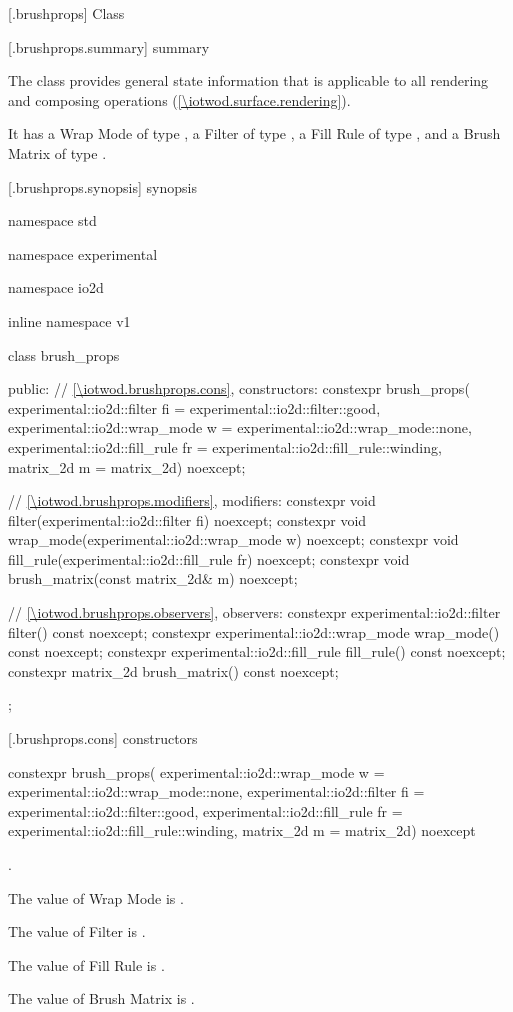
 [\iotwod.brushprops] {Class }

 [\iotwod.brushprops.summary] { summary}

\pnum
{}%
The  class provides general state information that is applicable to all rendering and composing operations (\ref{\iotwod.surface.rendering}).

\pnum
It has a Wrap Mode of type , a Filter of type , a Fill Rule of type , and a Brush Matrix of type .

 [\iotwod.brushprops.synopsis] { synopsis}

\begin{codeblock}
namespace std { namespace experimental { namespace io2d { inline namespace v1 {
  class brush_props {
  public:
    // \ref{\iotwod.brushprops.cons}, constructors:
    constexpr brush_props(
      experimental::io2d::filter fi = experimental::io2d::filter::good,
      experimental::io2d::wrap_mode w = experimental::io2d::wrap_mode::none,
      experimental::io2d::fill_rule fr = experimental::io2d::fill_rule::winding,
      matrix_2d m = matrix_2d{}) noexcept;

    // \ref{\iotwod.brushprops.modifiers}, modifiers:
    constexpr void filter(experimental::io2d::filter fi) noexcept;
    constexpr void wrap_mode(experimental::io2d::wrap_mode w) noexcept;
    constexpr void fill_rule(experimental::io2d::fill_rule fr) noexcept;
    constexpr void brush_matrix(const matrix_2d& m) noexcept;

    // \ref{\iotwod.brushprops.observers}, observers:
    constexpr experimental::io2d::filter filter() const noexcept;
    constexpr experimental::io2d::wrap_mode wrap_mode() const noexcept;
    constexpr experimental::io2d::fill_rule fill_rule() const noexcept;
    constexpr matrix_2d brush_matrix() const noexcept;
  };
}}}}
\end{codeblock}

 [\iotwod.brushprops.cons] { constructors}

\begin{itemdecl}
constexpr brush_props(
  experimental::io2d::wrap_mode w = experimental::io2d::wrap_mode::none,
  experimental::io2d::filter fi = experimental::io2d::filter::good,
  experimental::io2d::fill_rule fr = experimental::io2d::fill_rule::winding,
  matrix_2d m = matrix_2d{}) noexcept    
\end{itemdecl}
\begin{itemdescr}
\onecolumn
\requires
{}.

\pnum
\effects
The value of Wrap Mode is .

\pnum
The value of Filter is .

\pnum
The value of Fill Rule is .

\pnum
The value of Brush Matrix is .
\end{itemdescr}

